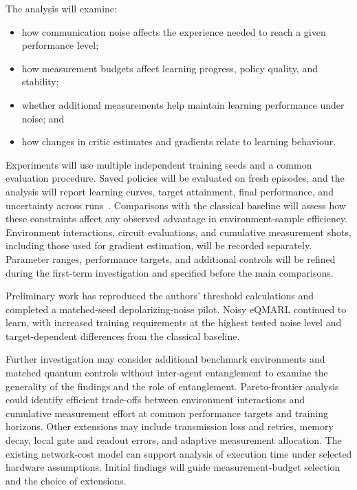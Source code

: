 \documentclass[12pt]{article}
\begin{document}
The analysis will examine:

\begin{itemize}
    \item how communication noise affects the experience needed to reach a given performance level;
    \item how measurement budgets affect learning progress, policy quality, and stability;
    \item whether additional measurements help maintain learning performance under noise; and
    \item how changes in critic estimates and gradients relate to learning behaviour.
\end{itemize}

Experiments will use multiple independent training seeds and a common evaluation procedure. Saved policies will be evaluated on fresh episodes, and the analysis will report learning curves, target attainment, final performance, and uncertainty across runs~\cite{agarwal,patterson}. Comparisons with the classical baseline will assess how these constraints affect any observed advantage in environment-sample efficiency. Environment interactions, circuit evaluations, and cumulative measurement shots, including those used for gradient estimation, will be recorded separately. Parameter ranges, performance targets, and additional controls will be refined during the first-term investigation and specified before the main comparisons.

Preliminary work has reproduced the authors' threshold calculations and completed a matched-seed depolarizing-noise pilot. Noisy eQMARL continued to learn, with increased training requirements at the highest tested noise level and target-dependent differences from the classical baseline.

Further investigation may consider additional benchmark environments and matched quantum controls without inter-agent entanglement to examine the generality of the findings and the role of entanglement. Pareto-frontier analysis could identify efficient trade-offs between environment interactions and cumulative measurement effort at common performance targets and training horizons. Other extensions may include transmission loss and retries, memory decay, local gate and readout errors, and adaptive measurement allocation. The existing network-cost model can support analysis of execution time under selected hardware assumptions. Initial findings will guide measurement-budget selection and the choice of extensions.
\end{document}
